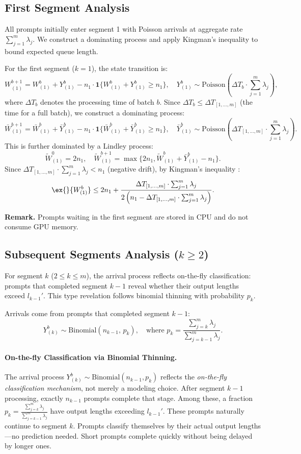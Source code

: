\subsection{First Segment Analysis}

All prompts initially enter segment 1 with Poisson arrivals at aggregate rate $\sum_{j=1}^m \lambda_j$. We construct a dominating process and apply Kingman's inequality to bound expected queue length.

For the first segment ($k=1$), the state transition is:
$$ W^{b+1}_{(1)} =  W^b_{(1)} + Y^b_{(1)} -n_1\cdot  \mathbf{1}\{ W^b_{(1)} + Y^b_{(1)}\geq n_1 \},\quad Y^b_{(1)}\sim \text{Poisson}(\Delta T_b \cdot \sum_{j=1}^m \lambda_j), $$
where $\Delta T_b$ denotes the processing time of batch $b$. Since $\Delta T_b\leq \Delta T_{[1,\ldots,m]}$ (the time for a full batch), we construct a dominating process:
$$ \bar{W}^{b+1}_{(1)} =  \bar{W}^b_{(1)} + \bar{Y}^b_{(1)} -n_1\cdot  \mathbf{1}\{ \bar{W}^b_{(1)} + \bar{Y}^b_{(1)}\geq n_1 \},\quad \bar{Y}^b_{(1)}\sim \text{Poisson}(\Delta T_{[1,\ldots,m]}\cdot \sum_{j=1}^m \lambda_j). $$
This is further dominated by a Lindley process:
$$\tilde{W}^0_{(1)}=2n_1, \quad \tilde{W}^{b+1}_{(1)}=\max\{2n_1, \tilde{W}^b_{(1)}+\bar{Y}^b_{(1)}-n_1\}.$$
Since $\Delta T_{[1,\ldots,m]}\cdot \sum_{j=1}^m \lambda_j<n_1$ (negative drift), by Kingman's inequality \citep{kingman1962queues}:
$$\ex{}{W^b_{(1)}}\leq 2n_1 + \frac{\Delta T_{[1,\ldots,m]}\cdot \sum_{j=1}^m \lambda_j}{2\left( n_1 - \Delta T_{[1,\ldots,m]}\cdot \sum_{j=1}^m \lambda_j\right)}. $$

\noindent\textbf{Remark.} Prompts waiting in the first segment are stored in CPU and do not consume GPU memory.

\subsection{Subsequent Segments Analysis ($k \geq 2$)}

For segment $k$ ($2\leq k\leq m$), the arrival process reflects on-the-fly classification: prompts that completed segment $k-1$ reveal whether their output lengths exceed $l_{k-1}'$. This type revelation follows binomial thinning with probability $p_k$.

Arrivals come from prompts that completed segment $k-1$:
$$Y^b_{(k)} \sim \text{Binomial}\left(  n_{k-1} ,\, p_k \right),\quad \text{where } p_k = \frac{\sum_{j=k}^m \lambda_j}{\sum_{j=k-1}^m \lambda_j}.$$

\paragraph{On-the-fly Classification via Binomial Thinning.}
The arrival process $Y^b_{(k)} \sim \text{Binomial}(n_{k-1}, p_k)$ reflects the \emph{on-the-fly classification mechanism}, not merely a modeling choice. After segment $k-1$ processing, exactly $n_{k-1}$ prompts complete that stage. Among these, a fraction $p_k = \frac{\sum_{j=k}^m \lambda_j}{\sum_{j=k-1}^m \lambda_j}$ have output lengths exceeding $l_{k-1}'$. These prompts naturally continue to segment $k$. Prompts classify themselves by their actual output lengths—no prediction needed. Short prompts complete quickly without being delayed by longer ones.

